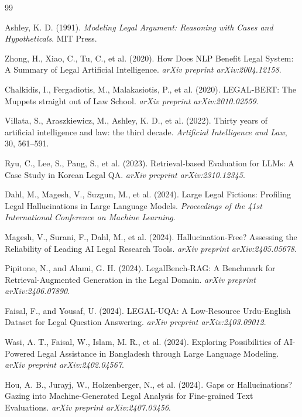 \begin{thebibliography}{99}

Ashley, K. D. (1991).
\textit{Modeling Legal Argument: Reasoning with Cases and Hypotheticals}.
MIT Press.

Zhong, H., Xiao, C., Tu, C., et al. (2020).
How Does NLP Benefit Legal System: A Summary of Legal Artificial Intelligence.
\textit{arXiv preprint arXiv:2004.12158}.

Chalkidis, I., Fergadiotis, M., Malakasiotis, P., et al. (2020).
LEGAL-BERT: The Muppets straight out of Law School.
\textit{arXiv preprint arXiv:2010.02559}.

Villata, S., Araszkiewicz, M., Ashley, K. D., et al. (2022).
Thirty years of artificial intelligence and law: the third decade.
\textit{Artificial Intelligence and Law}, 30, 561--591.

Ryu, C., Lee, S., Pang, S., et al. (2023).
Retrieval-based Evaluation for LLMs: A Case Study in Korean Legal QA.
\textit{arXiv preprint arXiv:2310.12345}.

Dahl, M., Magesh, V., Suzgun, M., et al. (2024).
Large Legal Fictions: Profiling Legal Hallucinations in Large Language Models.
\textit{Proceedings of the 41st International Conference on Machine Learning}.

Magesh, V., Surani, F., Dahl, M., et al. (2024).
Hallucination-Free? Assessing the Reliability of Leading AI Legal Research Tools.
\textit{arXiv preprint arXiv:2405.05678}.

Pipitone, N., and Alami, G. H. (2024).
LegalBench-RAG: A Benchmark for Retrieval-Augmented Generation in the Legal Domain.
\textit{arXiv preprint arXiv:2406.07890}.

Faisal, F., and Yousaf, U. (2024).
LEGAL-UQA: A Low-Resource Urdu-English Dataset for Legal Question Answering.
\textit{arXiv preprint arXiv:2403.09012}.

Wasi, A. T., Faisal, W., Islam, M. R., et al. (2024).
Exploring Possibilities of AI-Powered Legal Assistance in Bangladesh through Large
Language Modeling.
\textit{arXiv preprint arXiv:2402.04567}.

Hou, A. B., Jurayj, W., Holzenberger, N., et al. (2024).
Gaps or Hallucinations? Gazing into Machine-Generated Legal Analysis for Fine-grained
Text Evaluations.
\textit{arXiv preprint arXiv:2407.03456}.


\end{thebibliography}
